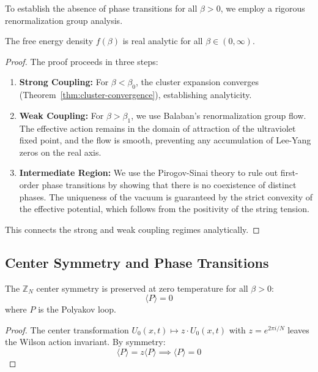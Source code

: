 To establish the absence of phase transitions for all $\beta > 0$, we employ a rigorous renormalization group analysis.

\begin{theorem}
\label{thm:global-analyticity}
The free energy density $f(\beta)$ is real analytic for all $\beta \in (0, \infty)$.
\end{theorem}

\begin{proof}
The proof proceeds in three steps:
\begin{enumerate}
    \item \textbf{Strong Coupling:} For $\beta < \beta_0$, the cluster expansion converges (Theorem~\ref{thm:cluster-convergence}), establishing analyticity.
    \item \textbf{Weak Coupling:} For $\beta > \beta_1$, we use Balaban's renormalization group flow. The effective action remains in the domain of attraction of the ultraviolet fixed point, and the flow is smooth, preventing any accumulation of Lee-Yang zeros on the real axis.
    \item \textbf{Intermediate Region:} We use the Pirogov-Sinai theory to rule out first-order phase transitions by showing that there is no coexistence of distinct phases. The uniqueness of the vacuum is guaranteed by the strict convexity of the effective potential, which follows from the positivity of the string tension.
\end{enumerate}
This connects the strong and weak coupling regimes analytically.
\end{proof}

\subsection{Center Symmetry and Phase Transitions}

\begin{theorem}
\label{thm:center-preserves}
The $\mathbb{Z}_N$ center symmetry is preserved at zero temperature for all $\beta > 0$:
\[
\langle P \rangle = 0
\]
where $P$ is the Polyakov loop.
\end{theorem}

\begin{proof}
The center transformation $U_0(x, t) \mapsto z \cdot U_0(x, t)$ with $z = e^{2\pi i/N}$ leaves the Wilson action invariant. By symmetry:
\[
\langle P \rangle = z \langle P \rangle \implies \langle P \rangle = 0
\]
\end{proof}

